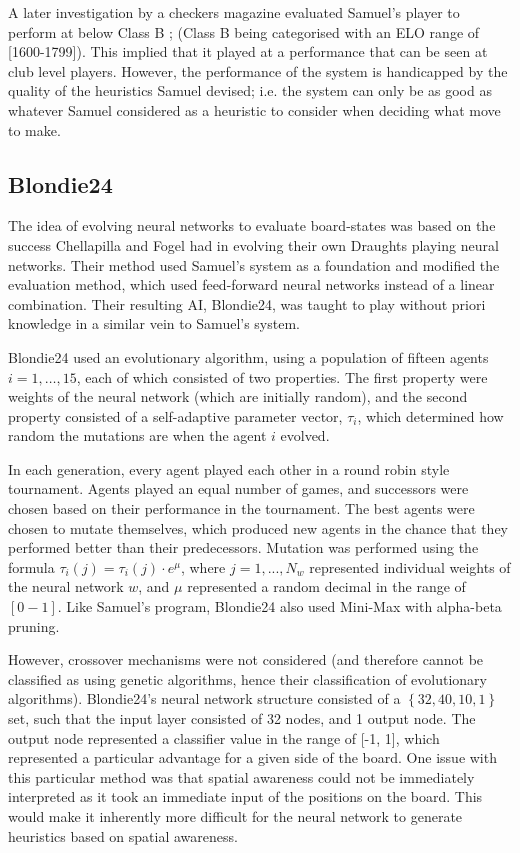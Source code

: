 \documentclass[12pt,a4paper]{article}
\begin{document}
        A later investigation by a checkers magazine evaluated Samuel's player to perform at below Class B \cite{schaeffer_one_1997,fogel_evolving_2000}; (Class B being categorised with an ELO range of [1600-1799]). This implied that it played at a performance that can be seen at club level players. \cite{elo_rating_2008} However, the performance of the system is handicapped by the quality of the heuristics Samuel devised; i.e. the system can only be as good as whatever Samuel considered as a heuristic to consider when deciding what move to make.

    \subsection{Blondie24}
        The idea of evolving neural networks to evaluate board-states was based on the success Chellapilla and Fogel had in evolving their own Draughts playing neural networks. Their method used Samuel's system as a foundation and modified the evaluation method, which used feed-forward neural networks instead of a linear combination. Their resulting AI, Blondie24, was taught to play without priori knowledge in a similar vein to Samuel's system. \cite{chellapilla_evolving_1999}

        Blondie24 used an evolutionary algorithm, using a population of fifteen agents $i=1,\dots,15$, each of which consisted of two properties. The first property were weights of the neural network (which are initially random), and the second property consisted of a self-adaptive parameter vector, $\tau_i$, which determined how random the mutations are when the agent $i$ evolved.
    
        In each generation, every agent played each other in a round robin style tournament. Agents played an equal number of games, and successors were chosen based on their performance in the tournament. The best agents were chosen to mutate themselves, which produced new agents in the chance that they performed better than their predecessors. Mutation was performed using the formula $\tau_i(j) = \tau_i(j) \cdot e^{\mu}$, where $j=1,...,N_w$ represented individual weights of the neural network $w$, and $\mu$ represented a random decimal in the range of $[0-1]$. Like Samuel's program, Blondie24 also used Mini-Max with alpha-beta pruning.

        However, crossover mechanisms were not considered (and therefore cannot be classified as using genetic algorithms, hence their classification of evolutionary algorithms). Blondie24's neural network structure consisted of a $\left\{ 32,40,10,1 \right\}$ set, such that the input layer consisted of 32 nodes, and 1 output node. The output node represented a classifier value in the range of [-1, 1], which represented a particular advantage for a given side of the board. One issue with this particular method was that spatial awareness could not be immediately interpreted as it took an immediate input of the positions on the board. This would make it inherently more difficult for the neural network to generate heuristics based on spatial awareness.
\end{document}
